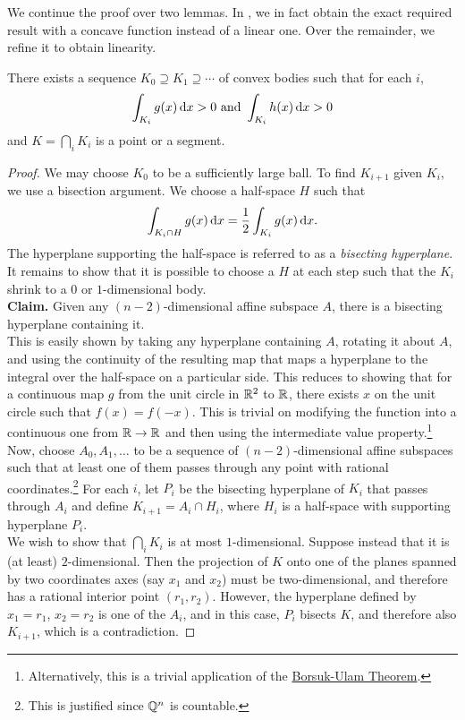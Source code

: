 We continue the proof over two lemmas. In , we in fact obtain the exact required result with a concave function instead of a linear one. Over the remainder, we refine it to obtain linearity.

\begin{lemma}
\label{localization lemma lemma 1}
	There exists a sequence $K_0\supseteq K_1 \supseteq \cdots$ of convex bodies such that for each $i$,
	\[ \int_{K_i} g(x)\operatorname{d}\!{x} > 0 \text{ and } \int_{K_i} h(x)\operatorname{d}\!{x} > 0 \]
	and $K=\bigcap_i K_i$ is a point or a segment.
\end{lemma}
\begin{proof}
	We may choose $K_0$ to be a sufficiently large ball. To find $K_{i+1}$ given $K_i$, we use a bisection argument. We choose a half-space $H$ such that
	\[ \int_{K_i\cap H} g(x)\operatorname{d}\!{x} = \frac{1}{2} \int_{K_i} g(x)\operatorname{d}\!{x}. \]
	The hyperplane supporting the half-space is referred to as a \textit{bisecting hyperplane}. It remains to show that it is possible to choose a $H$ at each step such that the $K_i$ shrink to a $0$ or $1$-dimensional body.\\

	\textbf{Claim.} Given any $(n-2)$-dimensional affine subspace $A$, there is a bisecting hyperplane containing it.\\
	This is easily shown by taking any hyperplane containing $A$, rotating it about $A$, and using the continuity of the resulting map that maps a hyperplane to the integral over the half-space on a particular side. This reduces to showing that for a continuous map $g$ from the unit circle in $\mathbb{R}^2$ to $\mathbb{R}$, there exists $x$ on the unit circle such that $f(x)=f(-x)$. This is trivial on modifying the function into a continuous one from $\mathbb{R}\to\mathbb{R}$ and then using the intermediate value property.\footnote{Alternatively, this is a trivial application of the \href{https://en.wikipedia.org/wiki/Borsuk-Ulam_theorem}{Borsuk-Ulam Theorem}.}\\

	Now, choose $A_0,A_1,\ldots$ to be a sequence of $(n-2)$-dimensional affine subspaces such that at least one of them passes through any point with rational coordinates.\footnote{This is justified since $\mathbb{Q}^n$ is countable.} For each $i$, let $P_i$ be the bisecting hyperplane of $K_i$ that passes through $A_i$ and define $K_{i+1}=A_i\cap H_i$, where $H_i$ is a half-space with supporting hyperplane $P_i$.\\
	We wish to show that $\bigcap_i K_i$ is at most $1$-dimensional. Suppose instead that it is (at least) $2$-dimensional. Then the projection of $K$ onto one of the planes spanned by two coordinates axes (say $x_1$ and $x_2$) must be two-dimensional, and therefore has a rational interior point $(r_1,r_2)$. However, the hyperplane defined by $x_1=r_1$, $x_2=r_2$ is one of the $A_i$, and in this case, $P_i$ bisects $K$, and therefore also $K_{i+1}$, which is a contradiction.
\end{proof}

